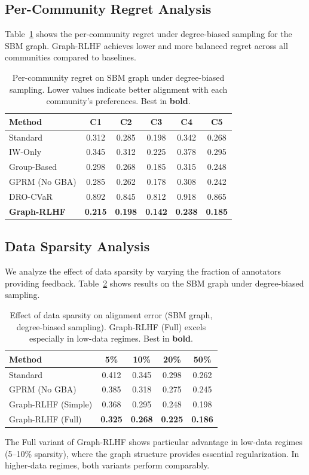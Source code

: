 \documentclass{article}
\theoremstyle{plain}
\theoremstyle{definition}
\theoremstyle{remark}
\begin{document}
\subsection{Per-Community Regret Analysis}
\label{app:community-regret}

Table~\ref{tab:community-regret} shows the per-community regret under degree-biased sampling for the SBM graph. Graph-RLHF achieves lower and more balanced regret across all communities compared to baselines. 


\begin{table}[h]
\caption{Per-community regret on SBM graph under degree-biased sampling. Lower values indicate better alignment with each community's preferences. Best in \textbf{bold}.}
\label{tab:community-regret}
\centering
\small
\begin{tabular}{lccccc}
\toprule
\textbf{Method} & \textbf{C1} & \textbf{C2} & \textbf{C3} & \textbf{C4} & \textbf{C5} \\
\midrule
Standard & 0.312 & 0.285 & 0.198 & 0.342 & 0.268 \\
IW-Only & 0.345 & 0.312 & 0.225 & 0.378 & 0.295 \\
Group-Based & 0.298 & 0.268 & 0.185 & 0.315 & 0.248 \\
GPRM (No GBA) & 0.285 & 0.262 & 0.178 & 0.308 & 0.242 \\
DRO-CVaR & 0.892 & 0.845 & 0.812 & 0.918 & 0.865 \\
\textbf{Graph-RLHF} & \textbf{0.215} & \textbf{0.198} & \textbf{0.142} & \textbf{0.238} & \textbf{0.185} \\
\bottomrule
\end{tabular}
\end{table}

\subsection{Data Sparsity Analysis}
\label{app:sparsity}

We analyze the effect of data sparsity by varying the fraction of annotators providing feedback. Table~\ref{tab:sparsity-ablation} shows results on the SBM graph under degree-biased sampling.

\begin{table}[h]
\caption{Effect of data sparsity on alignment error (SBM graph, degree-biased sampling). Graph-RLHF (Full) excels especially in low-data regimes. Best in \textbf{bold}.}
\label{tab:sparsity-ablation}
\centering
\small
\begin{tabular}{lcccc}
\toprule
\textbf{Method} & \textbf{5\%} & \textbf{10\%} & \textbf{20\%} & \textbf{50\%} \\
\midrule
Standard & 0.412 & 0.345 & 0.298 & 0.262 \\
GPRM (No GBA) & 0.385 & 0.318 & 0.275 & 0.245 \\
Graph-RLHF (Simple) & 0.368 & 0.295 & 0.248 & 0.198 \\
Graph-RLHF (Full) & \textbf{0.325} & \textbf{0.268} & \textbf{0.225} & \textbf{0.186} \\
\bottomrule
\end{tabular}
\end{table}

The Full variant of Graph-RLHF shows particular advantage in low-data regimes (5--10\% sparsity), where the graph structure provides essential regularization. In higher-data regimes, both variants perform comparably.
\end{document}
